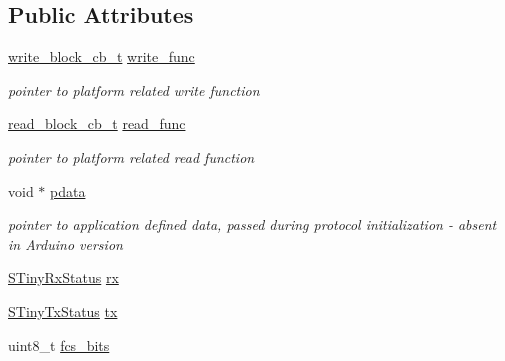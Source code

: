 \subsection*{Public Attributes}
\begin{DoxyCompactItemize}
\item 
\hypertarget{structSTinyData_a26c40b0b7e18776af99745624c460c5a}{}\hyperlink{inc_2tiny__layer2_8h_a7f69e669de5baa69a43ee5cb439a7496}{write\+\_\+block\+\_\+cb\+\_\+t} \hyperlink{structSTinyData_a26c40b0b7e18776af99745624c460c5a}{write\+\_\+func}\label{structSTinyData_a26c40b0b7e18776af99745624c460c5a}

\begin{DoxyCompactList}\small\item\em pointer to platform related write function \end{DoxyCompactList}\item 
\hypertarget{structSTinyData_a9714041284fd99230be0e7efbc8c60cf}{}\hyperlink{inc_2tiny__layer2_8h_ae3d867e030f59de94508902f2b84a7ec}{read\+\_\+block\+\_\+cb\+\_\+t} \hyperlink{structSTinyData_a9714041284fd99230be0e7efbc8c60cf}{read\+\_\+func}\label{structSTinyData_a9714041284fd99230be0e7efbc8c60cf}

\begin{DoxyCompactList}\small\item\em pointer to platform related read function \end{DoxyCompactList}\item 
\hypertarget{structSTinyData_abe4e0a41ad5a7ee57c4b3d54c788f638}{}void $\ast$ \hyperlink{structSTinyData_abe4e0a41ad5a7ee57c4b3d54c788f638}{pdata}\label{structSTinyData_abe4e0a41ad5a7ee57c4b3d54c788f638}

\begin{DoxyCompactList}\small\item\em pointer to application defined data, passed during protocol initialization -\/ absent in Arduino version \end{DoxyCompactList}\item 
\hyperlink{structSTinyRxStatus}{S\+Tiny\+Rx\+Status} \hyperlink{structSTinyData_aa3b43db99a1a6bf3d562f932d5a539db}{rx}
\item 
\hyperlink{structSTinyTxStatus}{S\+Tiny\+Tx\+Status} \hyperlink{structSTinyData_aa099adb35f3494332747eb18851fbb23}{tx}
\item 
\hypertarget{structSTinyData_a3cf4d6009cc472630e20a68d6fa50186}{}uint8\+\_\+t \hyperlink{structSTinyData_a3cf4d6009cc472630e20a68d6fa50186}{fcs\+\_\+bits}\label{structSTinyData_a3cf4d6009cc472630e20a68d6fa50186}


\end{DoxyCompactItemize}
